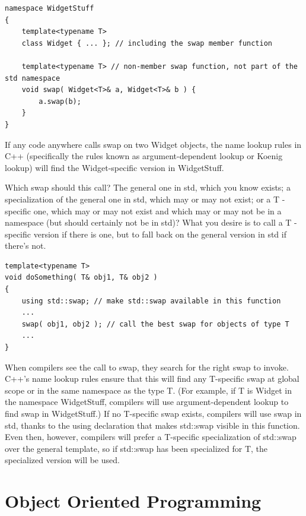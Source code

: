 \documentclass[a4paper,12pt,notitlepage]{article}
\begin{document}
\begin{verbatim}
namespace WidgetStuff
{
    template<typename T>
    class Widget { ... }; // including the swap member function

    template<typename T> // non-member swap function, not part of the std namespace
    void swap( Widget<T>& a, Widget<T>& b ) {
        a.swap(b);
    }
}
\end{verbatim}

If any code anywhere calls swap on two Widget objects, the name lookup rules in C++ (specifically
the rules known as argument-dependent lookup or Koenig lookup) will find the Widget-specific version
in WidgetStuff.

Which swap should this call? The general one in std, which you know exists; a specialization of the
general one in std, which may or may not exist; or a T -specific one, which may or may not exist and
which may or may not be in a namespace (but should certainly not be in std)? What you desire is to
call a T -specific version if there is one, but to fall back on the general version in std if
there's not.

\begin{verbatim}
template<typename T>
void doSomething( T& obj1, T& obj2 )
{
    using std::swap; // make std::swap available in this function
    ...
    swap( obj1, obj2 ); // call the best swap for objects of type T
    ...
}
\end{verbatim}

When compilers see the call to swap, they search for the right swap to invoke. C++'s name lookup
rules ensure that this will find any T-specific swap at global scope or in the same namespace as the
type T. (For example, if T is Widget in the namespace WidgetStuff, compilers will use
argument-dependent lookup to find swap in WidgetStuff.) If no T-specific swap exists, compilers will
use swap in std, thanks to the using declaration that makes std::swap visible in this function. Even
then, however, compilers will prefer a T-specific specialization of std::swap over the general
template, so if std::swap has been specialized for T, the specialized version will be used.


\section{Object Oriented Programming}
\end{document}
